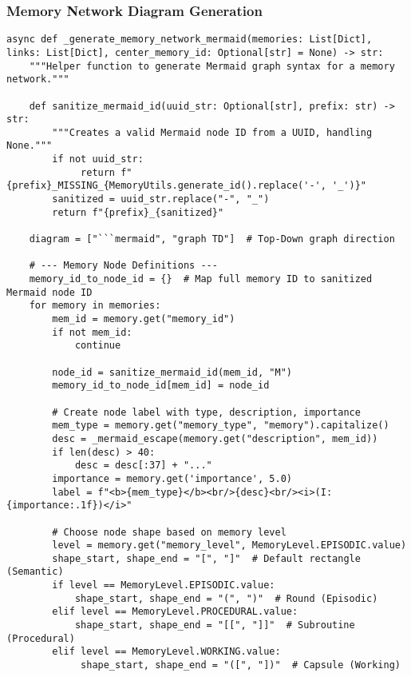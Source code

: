 \documentclass[12pt,a4paper]{article}
\begin{document}
\subsubsection*{Memory Network Diagram Generation}
\begin{pageablecode}
\begin{verbatim}
async def _generate_memory_network_mermaid(memories: List[Dict], links: List[Dict], center_memory_id: Optional[str] = None) -> str:
    """Helper function to generate Mermaid graph syntax for a memory network."""

    def sanitize_mermaid_id(uuid_str: Optional[str], prefix: str) -> str:
        """Creates a valid Mermaid node ID from a UUID, handling None."""
        if not uuid_str:
             return f"{prefix}_MISSING_{MemoryUtils.generate_id().replace('-', '_')}"
        sanitized = uuid_str.replace("-", "_")
        return f"{prefix}_{sanitized}"

    diagram = ["```mermaid", "graph TD"]  # Top-Down graph direction

    # --- Memory Node Definitions ---
    memory_id_to_node_id = {}  # Map full memory ID to sanitized Mermaid node ID
    for memory in memories:
        mem_id = memory.get("memory_id")
        if not mem_id:
            continue

        node_id = sanitize_mermaid_id(mem_id, "M")
        memory_id_to_node_id[mem_id] = node_id

        # Create node label with type, description, importance
        mem_type = memory.get("memory_type", "memory").capitalize()
        desc = _mermaid_escape(memory.get("description", mem_id))
        if len(desc) > 40:
            desc = desc[:37] + "..."
        importance = memory.get('importance', 5.0)
        label = f"<b>{mem_type}</b><br/>{desc}<br/><i>(I: {importance:.1f})</i>"

        # Choose node shape based on memory level
        level = memory.get("memory_level", MemoryLevel.EPISODIC.value)
        shape_start, shape_end = "[", "]"  # Default rectangle (Semantic)
        if level == MemoryLevel.EPISODIC.value:
            shape_start, shape_end = "(", ")"  # Round (Episodic)
        elif level == MemoryLevel.PROCEDURAL.value:
            shape_start, shape_end = "[[", "]]"  # Subroutine (Procedural)
        elif level == MemoryLevel.WORKING.value:
             shape_start, shape_end = "([", "])"  # Capsule (Working)


\end{verbatim}
\end{pageablecode}
\end{document}
